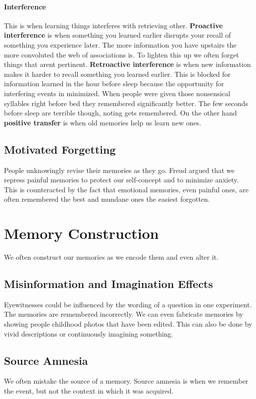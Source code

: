 \documentclass[12pt]{article}
\begin{document}
\paragraph*{Interference} This is when learning things interferes with retrieving other. \textbf{Proactive interference} is when something you learned earlier disrupts your recall of something you experience later. The more information you have upstairs the more convoluted the web of associations is. To lighten this up we often forget things that arent pertinent. \textbf{Retroactive interference} is when new information makes it harder to recall something you learned earlier. This is blocked for information learned in the hour before sleep because the opportunity for interfering events in minimized. When people were given those nonsensical syllables right before bed they remembered significantly better. The few seconds before sleep are terrible though, noting gets remembered. On the other hand \textbf{positive transfer} is when old memories help us learn new ones.
\subsection*{Motivated Forgetting} People unknowingly revise their memories as they go. Freud argued that we repress painful memories to protect our self-concept and to minimize anxiety. This is counteracted by the fact that emotional memories, even painful ones, are often remembered the best and mundane ones the easiest forgotten.
\section*{Memory Construction} 
We often construct our memories as we encode them and even alter it.
\subsection*{Misinformation and Imagination Effects} Eyewitnesses could be influenced by the wording of a question in one experiment. The memories are remembered incorrectly. We can even fabricate memories by showing people childhood photos that have been edited. This can also be done by vivid descriptions or continuously imagining something. 
\subsection*{Source Amnesia} We often mistake the source of a memory. Source amnesia is when we remember the event, but not the context in which it was acquired. 
\end{document}
